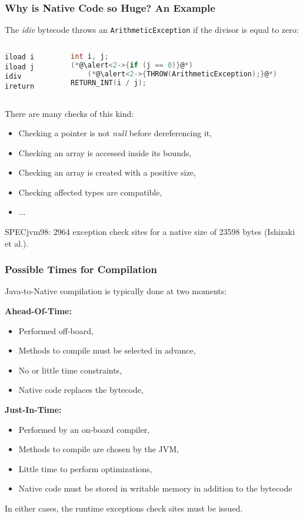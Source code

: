 \documentclass{beamer}
\begin{document}
\begin{frame}[fragile]\frametitle{Why is Native Code so Huge? An Example}
The \emph{idiv} bytecode throws an \texttt{ArithmeticException} if the divisor is equal to zero:

\begin{columns}
\begin{column}{5.1cm}
\begin{lstlisting}[language=jvmis]
iload i
iload j
idiv
ireturn
\end{lstlisting}
\end{column}
\begin{column}{5.1cm}
\begin{lstlisting}[language=C]
int i, j;
(*@\alert<2->{if (j == 0)}@*)
	(*@\alert<2->{THROW(ArithmeticException);}@*)
RETURN_INT(i / j);
\end{lstlisting}
\end{column}
\end{columns}
\bigskip
There are many checks of this kind:
\begin{itemize}
\item Checking a pointer is not \emph{null} before dereferencing it,
\item Checking an array is accessed inside its bounds,
\item Checking an array is created with a positive size,
\item Checking affected types are compatible,
\item ...
\end{itemize}
SPECjvm98: 2964 exception check sites for a native size of 23598 bytes (Ishizaki et al.).
\end{frame}


\begin{frame}\frametitle{Possible Times for Compilation}
Java-to-Native compilation is typically done at two moments:

\textbf{Ahead-Of-Time:}
\begin{itemize}
\item Performed off-board,
\item Methods to compile must be selected in advance,
\item No or little time constraints,
\item Native code replaces the bytecode,
\end{itemize}

\textbf{Just-In-Time:}
\begin{itemize}
\item Performed by an on-board compiler,
\item Methods to compile are chosen by the JVM,
\item Little time to perform optimizations,
\item Native code must be stored in writable memory in addition to the bytecode
\end{itemize}

In either cases, the runtime exceptions check sites must be issued.
\end{frame}
\end{document}
